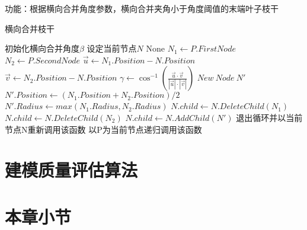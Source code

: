 功能：根据横向合并角度参数，横向合并夹角小于角度阈值的末端叶子枝干\\
\begin{algorithm}
	\caption{横向合并枝干}
\begin{algorithmic}[1]
	\Require 初始化横向合并角度$\beta$
	\Require 设定当前节点$N$
	\Ensure None
		\State $N_1 \gets P.FirstNode$
		\State $N_2 \gets P.SecondNode$
			\State $\vec{u} \gets N_1.Position - N.Position$
			\State $\vec{v} \gets N_2.Position - N.Position$
			\State $\gamma \gets \cos^{-1}({\frac{\vec{u} \cdot \vec{v}}{|\vec{u}|\cdot|\vec{v}|}})$
			\If{$\gamma<\beta$}
				\State $New\ Node\ N'$
				\State $N'.Position \gets (N_1.Position+N_2.Position)/2$
				\State $N'.Radius \gets max(N_1.Radius,N_2.Radius)$
				\State $N.child \gets N.DeleteChild(N_1)$
				\State $N.child \gets N.DeleteChild(N_2)$
				\State $N.child \gets N.AddChild(N')$
				\State 退出循环并以当前节点N重新调用该函数
			\EndIf
		\EndIf
	\EndFor
		\State 以P为当前节点递归调用该函数
	\EndFor
\end{algorithmic}
\end{algorithm}

\section{建模质量评估算法}
\label{sec:qualityevaluation}

\section{本章小节}
\label{sec:conclusion}
